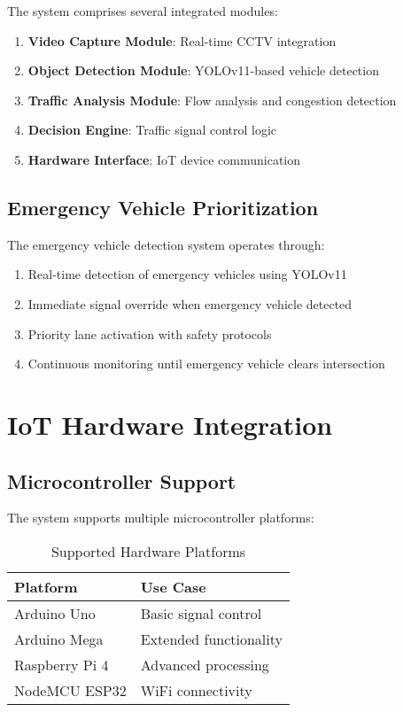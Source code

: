 The system comprises several integrated modules:

\begin{enumerate}
    \item \textbf{Video Capture Module}: Real-time CCTV integration
    \item \textbf{Object Detection Module}: YOLOv11-based vehicle detection
    \item \textbf{Traffic Analysis Module}: Flow analysis and congestion detection
    \item \textbf{Decision Engine}: Traffic signal control logic
    \item \textbf{Hardware Interface}: IoT device communication
\end{enumerate}

\subsection{Emergency Vehicle Prioritization}

The emergency vehicle detection system operates through:

\begin{enumerate}
    \item Real-time detection of emergency vehicles using YOLOv11
    \item Immediate signal override when emergency vehicle detected
    \item Priority lane activation with safety protocols
    \item Continuous monitoring until emergency vehicle clears intersection
\end{enumerate}

\section{IoT Hardware Integration}

\subsection{Microcontroller Support}

The system supports multiple microcontroller platforms:

\begin{table}[h]
\centering
\caption{Supported Hardware Platforms}
\begin{tabular}{|l|l|}
\hline
\textbf{Platform} & \textbf{Use Case} \\
\hline
Arduino Uno & Basic signal control \\
Arduino Mega & Extended functionality \\
Raspberry Pi 4 & Advanced processing \\
NodeMCU ESP32 & WiFi connectivity \\
\hline
\end{tabular}
\end{table}

